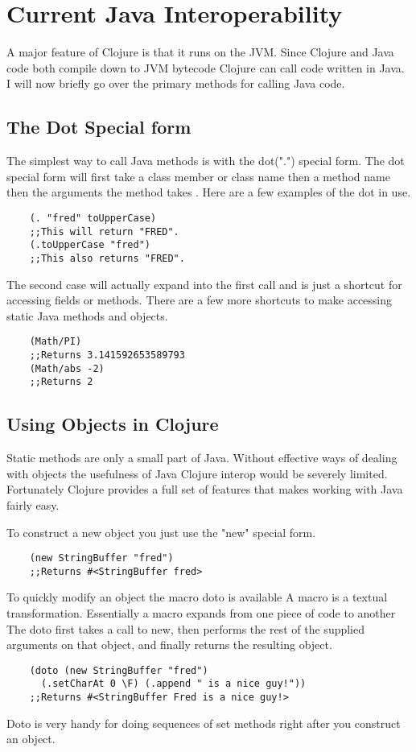 \documentclass[12pt]{article}
\begin{document}
\section{Current Java Interoperability}\label{sec:bg}
	A major feature of Clojure is that it runs on the JVM. 
Since Clojure and Java code both compile down to JVM bytecode Clojure can call code written in Java. I will now briefly go over the primary methods for calling Java code. 
	
	\subsection{The Dot Special form}
	The simplest way to call Java methods is with the dot(".") special form. 
The dot special form will first take a class member or class name then a method name then the arguments the method takes \cite{cloj:interop}. Here are a few examples of the dot in use.
	\begin{verbatim}
	(. "fred" toUpperCase)
	;;This will return "FRED".
	(.toUpperCase "fred")
	;;This also returns "FRED".
	\end{verbatim}
	The second case will actually expand into the first call and is just a shortcut for accessing fields or methods. There are a few more shortcuts to make accessing static Java methods and objects.
	
	\begin{verbatim}
	(Math/PI)
	;;Returns 3.141592653589793
	(Math/abs -2)
	;;Returns 2
	\end{verbatim}
	
	\subsection{Using Objects in Clojure}
	Static methods are only a small part of Java. Without effective ways of dealing with objects the usefulness of Java Clojure interop would be severely limited. Fortunately Clojure provides a full set of features that makes working with Java fairly easy.
	
	To construct a new object you just use the "new" special form.
	\begin{verbatim}
	(new StringBuffer "fred")
	;;Returns #<StringBuffer fred>
	\end{verbatim} 
	
	To quickly modify an object the macro doto is available A macro is a textual transformation. Essentially a macro expands from one piece of code to another 
 The doto first takes a call to new, then performs the rest of the supplied arguments on that object, and finally returns the resulting object.
	\begin{verbatim}
	(doto (new StringBuffer "fred") 
	  (.setCharAt 0 \F) (.append " is a nice guy!"))
	;;Returns #<StringBuffer Fred is a nice guy!>
	\end{verbatim}
	Doto is very handy for doing sequences of set methods right after you construct an object.
	
\end{document}
